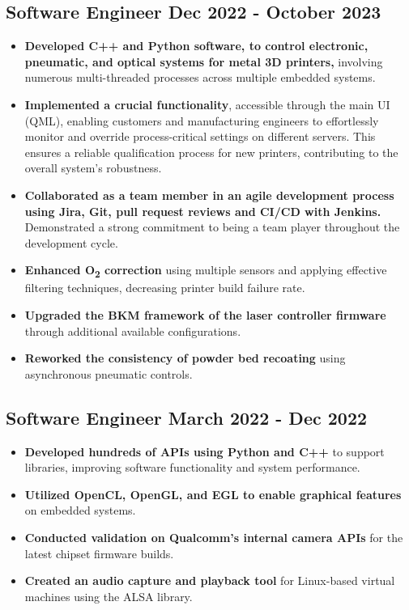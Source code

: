 \documentclass[]{article}
\begin{document}
\subsection{{\large{Software Engineer} \hfill{\small{Dec 2022 - October 2023}}}}
\vspace{1.5ex}

\begin{itemize}
    \item \textbf{Developed C++ and Python software, to control electronic, pneumatic, and optical systems for metal 3D printers,} involving numerous multi-threaded processes across multiple embedded systems.
    \item \textbf{Implemented a crucial functionality}, accessible through the main UI (QML), enabling customers and manufacturing engineers to effortlessly monitor and override process-critical settings on different servers. 
    This ensures a reliable qualification process for new printers, contributing to the overall system's robustness.
    \item \textbf{Collaborated as a team member in an agile development process using Jira, Git, pull request reviews and CI/CD with Jenkins.} Demonstrated a strong commitment to being a team player throughout the development cycle.
    \item \textbf{Enhanced O\textsubscript{2} correction} using multiple sensors and applying effective filtering techniques, decreasing printer build failure rate.
    \item \textbf{Upgraded the BKM framework of the laser controller firmware} through additional available configurations.
    \item \textbf{Reworked the consistency of powder bed recoating} using asynchronous pneumatic controls.
\end{itemize}

\vspace{2ex}

\subsection{{\large{Software Engineer} \hfill{\small{March 2022 - Dec 2022}}}}
\vspace{1.5ex}

\begin{itemize}
    \item \textbf{Developed hundreds of APIs using Python and C++} to support libraries, improving software functionality and system performance.
    \item \textbf{Utilized OpenCL, OpenGL, and EGL to enable graphical features} on embedded systems.
    \item \textbf{Conducted validation on Qualcomm's internal camera APIs} for the latest chipset firmware builds. 
    \item \textbf{Created an audio capture and playback tool} for Linux-based virtual machines using the ALSA library.
\end{itemize}
\end{document}
